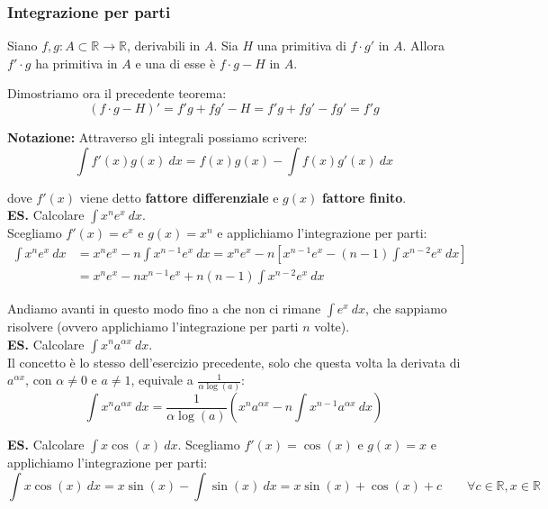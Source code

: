\documentclass{article}
\begin{document}
\subsubsection{Integrazione per parti}
Siano $f, g: A \subset \mathbb{R} \xrightarrow{} \mathbb{R}$, derivabili in $A$. Sia $H$ una primitiva di $f \cdot g'$ in $A$. Allora $f'\cdot g$ ha primitiva in $A$ e una di esse è $f \cdot g - H$ in $A$.

\noindent Dimostriamo ora il precedente teorema:
\begin{equation*}
    (f\cdot g - H)' = f'g + fg' - H = f'g + fg' - fg' = f'g
\end{equation*}

\noindent\textbf{Notazione:} Attraverso gli integrali possiamo scrivere:
\begin{equation*}
    \int f'(x)g(x) \ dx = f(x)g(x) - \int f(x)g'(x) \ dx
\end{equation*}

\noindent dove $f'(x)$ viene detto \textbf{fattore differenziale} e $g(x)$ \textbf{fattore finito}.\\

\noindent\textbf{ES.} Calcolare $\int x^n e^x \ dx$.\\
Scegliamo $f'(x) = e^x$ e $g(x) = x^n$ e applichiamo l'integrazione per parti:
\begin{align*}
    \int x^n e^x \ dx &= x^ne^x - n\int x^{n - 1}e^x \ dx = x^ne^x - n\left[x^{n-1} e^x - (n - 1)\int x^{n - 2} e^x \ dx \right]\\
    &= x^ne^x - nx^{n - 1}e^x + n(n - 1)\int x^{n - 2} e^x \ dx
\end{align*}

\noindent Andiamo avanti in questo modo fino a che non ci rimane $\int e^x \ dx$, che sappiamo risolvere (ovvero applichiamo l'integrazione per parti $n$ volte).\\

\noindent\textbf{ES.} Calcolare $\int x^n a^{\alpha x} \ dx$. \\
Il concetto è lo stesso dell'esercizio precedente, solo che questa volta la derivata di $a^{\alpha x}$, con $\alpha \neq 0$ e $a \neq 1$, equivale a $\frac{1}{\alpha\log(a)}$:
\begin{equation*}
    \int x^n a^{\alpha x} \ dx = \frac{1}{\alpha\log(a)} \left(x^na^{\alpha x} - n \int x^{n - 1} a^{\alpha x} \ dx\right)
\end{equation*}

\noindent\textbf{ES.} Calcolare $\int x\cos(x) \ dx$.
Scegliamo $f'(x) = \cos(x)$ e $g(x) = x$ e applichiamo l'integrazione per parti:
\begin{equation*}
    \int x\cos(x) \ dx = x\sin(x) - \int \sin(x) \ dx = x\sin(x) + \cos(x) + c \qquad \forall c \in \mathbb{R}, x \in \mathbb{R}
\end{equation*}
\end{document}
